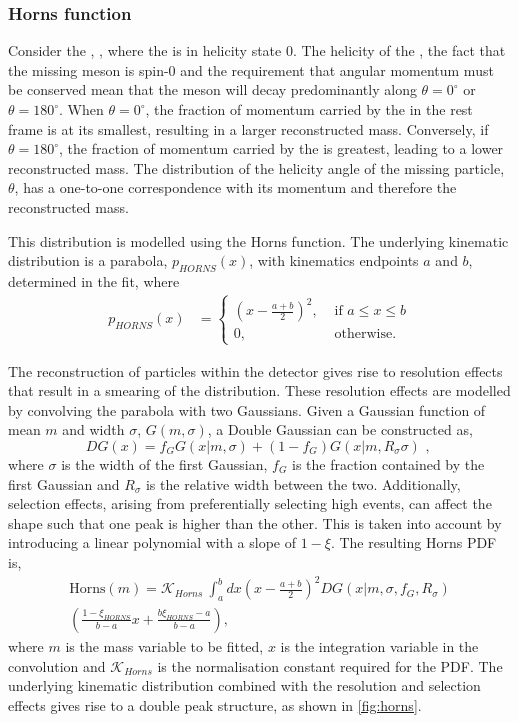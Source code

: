 \subsubsection{Horns function}

Consider the \decay{\Bm}{\Dstarz\Kstarm}, \decay{\Dstarz}{\Dz\piz}, where the \Dstarz is in helicity state 0. The helicity of the \Dstarz, the fact that the missing \piz meson is spin-0 and the requirement that angular momentum must be conserved mean that the \piz meson will decay predominantly along $\theta = 0^{\circ}$ or $\theta = 180^{\circ}$. When $\theta = 0^{\circ}$, the fraction of momentum carried by the \piz in the \Bm rest frame is at its smallest, resulting in a larger reconstructed \Bm mass. Conversely, if $\theta = 180^{\circ}$, the fraction of momentum carried by the \piz is greatest, leading to a lower reconstructed \Bm mass. The distribution of the helicity angle of the missing particle, $\theta$, has a one-to-one correspondence with its momentum and therefore the reconstructed \Bm mass. 

This distribution is modelled using the Horns function. The underlying kinematic distribution is a parabola, $p_{HORNS}(x)$, with kinematics endpoints $a$ and $b$, determined in the fit, where
\begin{align}
p_{HORNS}(x) &= \begin{cases}
\left(x - \frac{a+b}{2}\right)^2, & \text{ if $a \leq x \leq b$}\\ 	
0, & \text{ otherwise.}
\end{cases} 
\end{align}

The reconstruction of particles within the \lhcb detector gives rise to resolution effects that result in a smearing of the distribution. These resolution effects are modelled by convolving the parabola with two Gaussians. Given a Gaussian function of mean $m$ and width $\sigma$, $G(m,\sigma)$, a Double Gaussian can be constructed as,
\begin{equation}
DG(x) = f_G G(x|m,\sigma) + \left(1-f_G\right) G(x|m,R_{\sigma}\sigma) \text{ , }
\end{equation}
where $\sigma$ is the width of the first Gaussian, $f_G$ is the fraction contained by the first Gaussian and $R_{\sigma}$ is the relative width between the two. Additionally, selection effects, arising from preferentially selecting high \pt events, can affect the shape such that one peak is higher than the other. This is taken into account by introducing a linear polynomial with a slope of $1 - \xi$. The resulting Horns PDF is,
\begin{multline}
\text{Horns}(m) = \mathcal{K}_{Horns}\ \int_a^b dx \left(x - \frac{a+b}{2}\right)^2 DG(x|m,\sigma,f_G,R_{\sigma}) \\
\left( \frac{1 - \xi_{HORNS}}{b - a}x + \frac{b\xi_{HORNS} - a}{b - a}\right),
\label{eqn:horns}
\end{multline}
where $m$ is the mass variable to be fitted, $x$ is the integration variable in the convolution and $\mathcal{K}_{Horns}$ is the normalisation constant required for the PDF. The underlying kinematic distribution combined with the resolution and selection effects gives rise to a double peak structure, as shown in \fig\ref{fig:horns}.

